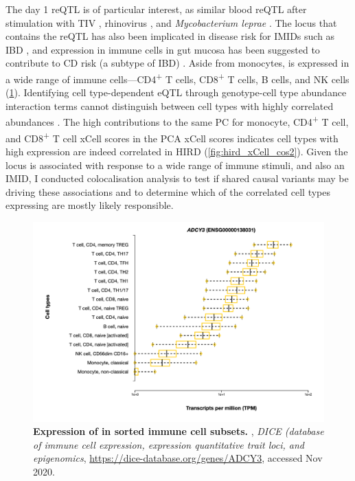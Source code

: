 The day 1  \gls{reQTL} is of particular interest,
as similar blood \gls{reQTL} after stimulation with \gls{TIV} \autocite{franco2013IntegrativeGenomicAnalysis}, rhinovirus \autocite{caliskan2015HostGeneticVariation}, and \textit{Mycobacterium leprae} \autocite{manry2017DecipheringGeneticControl}.
The locus that contains the  \gls{reQTL} has also been implicated in disease risk for \glspl{IMID} such as \gls{IBD} \autocite{delange2017GenomewideAssociationStudy},
and  expression in immune cells in gut mucosa has been suggested to contribute to \gls{CD} risk (a subtype of \gls{IBD}) \autocite{marigorta2017TranscriptionalRiskScores}.
Aside from monocytes,  is expressed in a wide range of immune cells---CD4\textsuperscript{+} T cells, CD8\textsuperscript{+} T cells, B cells, and \gls{NK} cells (\cref{fig:hird_eQTL_ADCY3_expression_DICE}).
Identifying cell type-dependent \gls{eQTL} through genotype-cell type abundance interaction terms cannot distinguish between cell types with highly correlated abundances \autocite{kim-hellmuth2020CellTypeSpecific}.
The high contributions to the same \gls{PC} for monocyte, CD4\textsuperscript{+} T cell, and CD8\textsuperscript{+} T cell xCell scores in the \gls{PCA} xCell scores indicates cell types with high  expression are indeed correlated in \gls{HIRD} (\cref{fig:hird_xCell_cos2}).
Given the locus is associated with response to a wide range of immune stimuli, and also an \gls{IMID},
I conducted colocalisation analysis to test if shared causal variants 
may be driving these associations and to determine which of the correlated cell types expressing  are mostly likely responsible.

\begin{figure}
    \centering
    \includegraphics[width=1.0\textwidth,page=1]{mainmatter/figures/chapter_03/ADCY3_expression.png}
    \caption{
        \textbf{Expression of  in sorted immune cell subsets.}
        \textcite{schmiedel2018ImpactGeneticPolymorphisms}, 
        \textit{DICE (database of immune cell expression, expression quantitative trait loci, and epigenomics}, 
        \url{https://dice-database.org/genes/ADCY3}, accessed Nov 2020.
    }
    \label{fig:hird_eQTL_ADCY3_expression_DICE}
\end{figure}

